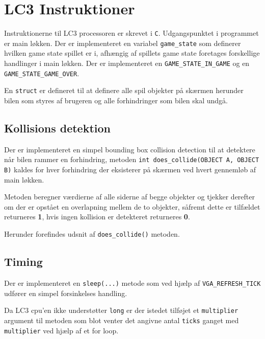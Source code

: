 \section{LC3 Instruktioner}
Instruktionerne til LC3 processoren er skrevet i \texttt{C}. Udgangspunktet i programmet er main løkken. Der er implementeret en variabel \texttt{game\_state} som definerer hvilken game state spillet er i, afhængig af spillets game state foretages forskellige handlinger i main løkken. Der er implementeret en \texttt{GAME\_STATE\_IN\_GAME} og en \texttt{GAME\_STATE\_GAME\_OVER}.

En \texttt{struct} er defineret til at definere alle spil objekter på skærmen herunder bilen som styres af brugeren og alle forhindringer som bilen skal undgå.


\subsection*{Kollisions detektion}
Der er implementeret en simpel bounding box collision detection til at detektere når bilen rammer en forhindring, metoden \texttt{int does\_collide(OBJECT A, OBJECT B)} kaldes for hver forhindring der eksisterer på skærmen ved hvert gennemløb af main løkken.

Metoden beregner værdierne af alle siderne af begge objekter og tjekker derefter om der er opstået en overlapning mellem de to objekter, såfremt dette er tilfældet returneres \textbf{1}, hvis ingen kollision er detekteret returneres \textbf{0}.

Herunder forefindes udsnit af \texttt{does\_collide()} metoden.


\subsection*{Timing}
Der er implementeret en \texttt{sleep(...)} metode som ved hjælp af \texttt{VGA\_REFRESH\_TICK} udfører en simpel forsinkelses handling.


Da LC3 cpu'en ikke understøtter \texttt{long} er der istedet tilføjet et \texttt{multiplier} argument til metoden som blot venter det angivne antal \texttt{ticks} ganget med \texttt{multiplier} ved hjælp af et for loop.

